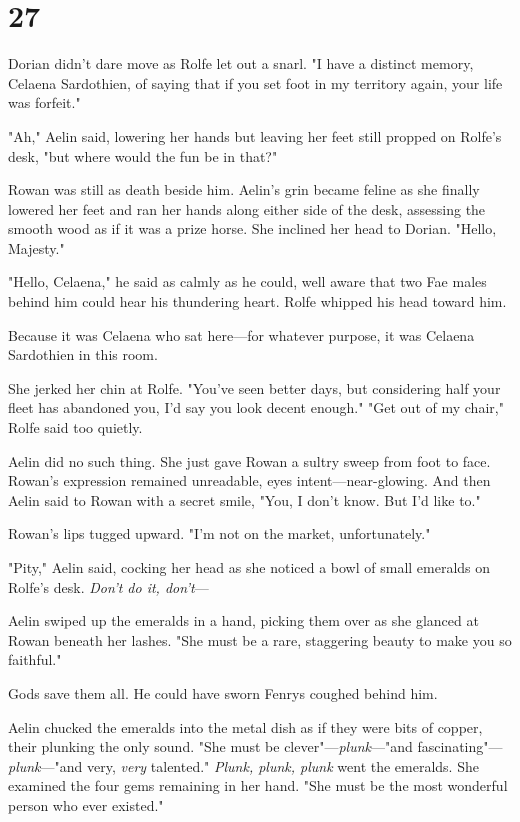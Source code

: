 
\chapter{27}

Dorian didn't dare move as Rolfe let out a snarl.
"I have a distinct memory, Celaena Sardothien, of saying that if you set foot in my territory again, your life was forfeit."

"Ah," Aelin said, lowering her hands but leaving her feet still propped on Rolfe's desk, "but where would the fun be in that?"

Rowan was still as death beside him.
Aelin's grin became feline as she finally lowered her feet and ran her hands along either side of the desk, assessing the smooth wood as if it was a prize horse.
She inclined her head to Dorian.
"Hello, Majesty."

"Hello, Celaena," he said as calmly as he could, well aware that two Fae males behind him could hear his thundering heart.
Rolfe whipped his head toward him.

Because it was Celaena who sat here---for whatever purpose, it was Celaena Sardothien in this room.

She jerked her chin at Rolfe.
"You've seen better days, but considering half your fleet has abandoned you, I'd say you look decent enough."
"Get out of my chair," Rolfe said too quietly.

Aelin did no such thing.
She just gave Rowan a sultry sweep from foot to face.
Rowan's expression remained unreadable, eyes intent---near-glowing.
And then Aelin said to Rowan with a secret smile, "You, I don't know.
But I'd like to."

Rowan's lips tugged upward.
"I'm not on the market, unfortunately."

"Pity," Aelin said, cocking her head as she noticed a bowl of small emeralds on Rolfe's desk.
\emph{Don't do it, don't}---

Aelin swiped up the emeralds in a hand, picking them over as she glanced at Rowan beneath her lashes.
"She must be a rare, staggering beauty to make you so faithful."

Gods save them all.
He could have sworn Fenrys coughed behind him.

Aelin chucked the emeralds into the metal dish as if they were bits of copper, their plunking the only sound.
"She must be clever"---\emph{plunk}---"and fascinating"---\emph{plunk}---"and very, \emph{very} talented."
\emph{Plunk, plunk, plunk} went the emeralds.
She examined the four gems remaining in her hand.
"She must be the most wonderful person who ever existed."


